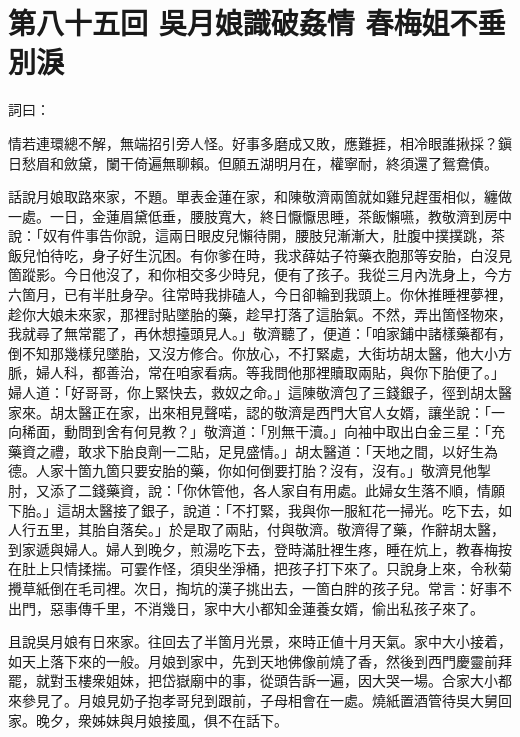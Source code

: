 
\chapter*{第八十五回 吳月娘識破姦情 春梅姐不垂別淚}


詞曰：

\begin{myquote}
情若連環總不解，無端招引旁人怪。好事多磨成又敗，應難捱，相冷眼誰揪採？鎭日愁眉和斂黛，闌干倚遍無聊賴。但願五湖明月在，權寧耐，終須還了鴛鴦債。

\end{myquote}

話說月娘取路來家，不題。單表金蓮在家，和陳敬濟兩箇就如雞兒趕蛋相似，纏做一處。一日，金蓮眉黛低垂，腰肢寬大，終日懨懨思睡，茶飯懶嚥，教敬濟到房中說：「奴有件事告你說，這兩日眼皮兒懶待開，腰肢兒漸漸大，肚腹中撲撲跳，茶飯兒怕待吃，身子好生沉困。有你爹在時，我求薛姑子符藥衣胞那等安胎，白沒見箇蹤影。今日他沒了，和你相交多少時兒，便有了孩子。{}我從三月內洗身上，今方六箇月，已有半肚身孕。往常時我排磕人，今日卻輪到我頭上。你休推睡裡夢裡，趁你大娘未來家，那裡討貼墜胎的藥，趁早打落了這胎氣。不然，弄出箇怪物來，我就尋了無常罷了，再休想擡頭見人。」敬濟聽了，便道：「咱家鋪中諸樣藥都有，倒不知那幾樣兒墜胎，又沒方修合。你放心，不打緊處，大街坊胡太醫，他大小方脈，婦人科，都善治，常在咱家看病。等我問他那裡贖取兩貼，與你下胎便了。」婦人道：「好哥哥，你上緊快去，救奴之命。」這陳敬濟包了三錢銀子，徑到胡太醫家來。胡太醫正在家，出來相見聲喏，認的敬濟是西門大官人女婿，讓坐說：「一向稀面，動問到舍有何見教？」敬濟道：「別無干瀆。」向袖中取出白金三星：「充藥資之禮，敢求下胎良劑一二貼，足見盛情。」胡太醫道：「天地之間，以好生為德。人家十箇九箇只要安胎的藥，你如何倒要打胎？沒有，沒有。」敬濟見他掣肘，又添了二錢藥資，說：「你休管他，各人家自有用處。此婦女生落不順，情願下胎。」這胡太醫接了銀子，說道：「不打緊，我與你一服紅花一掃光。吃下去，如人行五里，其胎自落矣。」於是取了兩貼，付與敬濟。敬濟得了藥，作辭胡太醫，到家遞與婦人。婦人到晚夕，煎湯吃下去，登時滿肚裡生疼，睡在炕上，教春梅按在肚上只情揉揣。可霎作怪，須臾坐淨桶，把孩子打下來了。只說身上來，令秋菊攪草紙倒在毛司裡。次日，掏坑的漢子挑出去，一箇白胖的孩子兒。常言：好事不出門，惡事傳千里，不消幾日，家中大小都知金蓮養女婿，偷出私孩子來了。

且說吳月娘有日來家。往回去了半箇月光景，來時正値十月天氣。家中大小接着，如天上落下來的一般。{}月娘到家中，先到天地佛像前燒了香，然後到西門慶靈前拜罷，就對玉樓衆姐妹，把岱嶽廟中的事，從頭告訴一遍，因大哭一場。{}合家大小都來參見了。月娘見奶子抱孝哥兒到跟前，子母相會在一處。燒紙置酒管待吳大舅回家。晚夕，衆姊妹與月娘接風，俱不在話下。

